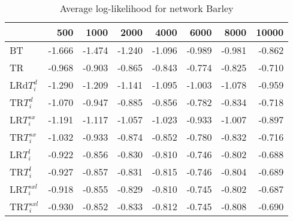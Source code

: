 \begin{table}
 \begin{center}
 \begin{tabular}{lrrrrrrr}
& 500 &  1000 & 2000 & 4000 & 6000& 8000&  10000\\\hline
BT & -1.666 & -1.474 & -1.240 & -1.096 & -0.989 & -0.981 & -0.862\\\hline
TR & -0.968 & -0.903 & -0.865 & -0.843 & -0.774 & -0.825 & -0.710\\\hline
LRd$T_i^d$ & -1.290 & -1.209 & -1.141 & -1.095 & -1.003 & -1.078 & -0.959\\\hline
TR$T_i^d$ & -1.070 & -0.947 & -0.885 & -0.856 & -0.782 & -0.834 & -0.718\\\hline
LR$T_i^{sx}$ & -1.191 & -1.117 & -1.057 & -1.023 & -0.933 & -1.007 & -0.897\\\hline
TR$T_i^{sx}$ & -1.032 & -0.933 & -0.874 & -0.852 & -0.780 & -0.832 & -0.716\\\hline
LR$T_i^l$ & -0.922 & -0.856 & -0.830 & -0.810 & -0.746 & -0.802 & -0.688\\\hline
TR$T_i^l$ & -0.927 & -0.857 & -0.831 & -0.815 & -0.746 & -0.804 & -0.689\\\hline
LR$T_i^{sxl}$ & -0.918 & -0.855 & -0.829 & -0.810 & -0.745 & -0.802 & -0.687\\\hline
TR$T_i^{sxl}$ & -0.930 & -0.852 & -0.833 & -0.812 & -0.745 & -0.808 & -0.690\\\hline
\end{tabular}
\end{center}
\caption{Average log-likelihood for network Barley }
\label{Barleyll}
\end{table}



